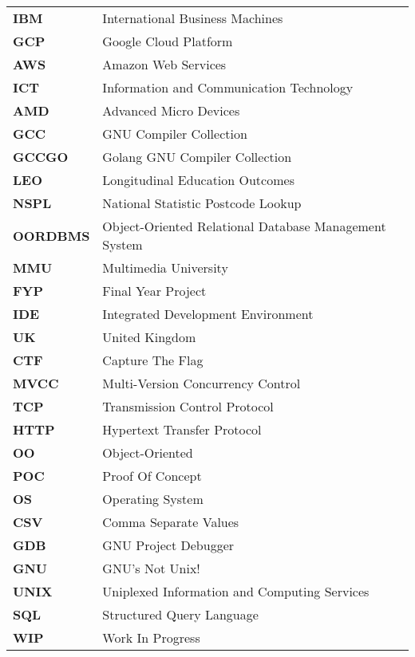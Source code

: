 \documentclass[12pt, oneside]{Thesis}
\begin{document}
\pagestyle{fancy} %
%
\pagebreak
{} 
%
%
\begin{table}[ht]
	\begin{tabular}{p{2.5cm}p{11.0cm}}
		
		\textbf{IBM} & International Business Machines\\
		\textbf{GCP} & Google Cloud Platform\\
		\textbf{AWS} & Amazon Web Services\\
		\textbf{ICT} & Information and Communication Technology\\
		\textbf{AMD} & Advanced Micro Devices\\
		\textbf{GCC} & GNU Compiler Collection\\
		\textbf{GCCGO} & Golang GNU Compiler Collection\\
		\textbf{LEO} & Longitudinal Education Outcomes \\
		\textbf{NSPL} & National Statistic Postcode Lookup\\
		\textbf{OORDBMS} & Object-Oriented Relational Database Management System\\
		\textbf{MMU} & Multimedia University\\
		\textbf{FYP} & Final Year Project\\
		\textbf{IDE} & Integrated Development Environment\\
		\textbf{UK} & United Kingdom\\
		\textbf{CTF} & Capture The Flag\\ 
		\textbf{MVCC} & Multi-Version Concurrency Control\\
		\textbf{TCP} & Transmission Control Protocol\\
		\textbf{HTTP} & Hypertext Transfer Protocol\\
		\textbf{OO} & Object-Oriented\\
		\textbf{POC} & Proof Of Concept\\
		\textbf{OS} & Operating System\\
		\textbf{CSV} & Comma Separate Values\\
		\textbf{GDB} & GNU Project Debugger\\
		\textbf{GNU} & GNU's Not Unix!\\
		\textbf{UNIX} & Uniplexed Information and Computing Services\\
		\textbf{SQL} & Structured Query Language\\
		\textbf{WIP} & Work In Progress\\
		
		
	\end{tabular}
\end{table}
\end{document}
